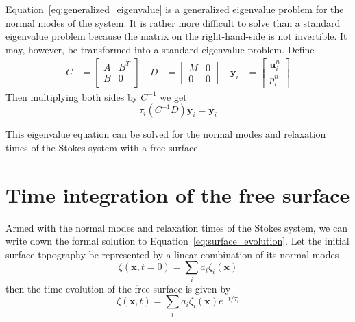 \documentclass[preprint,12pt,authoryear]{elsarticle}
\begin{document}
Equation~\eqref{eq:generalized_eigenvalue} is a generalized eigenvalue problem for the normal modes of the system.
It is rather more difficult to solve than a standard eigenvalue problem because the matrix on the right-hand-side 
is not invertible. It may, however, be transformed into a standard eigenvalue problem.
Define
\begin{equation}
\begin{aligned}
C &= 
\begin{bmatrix}
A & B^T \\
B & 0 \\
\end{bmatrix} \quad
D &= 
\begin{bmatrix}
M & 0 \\
0 & 0
\end{bmatrix} \quad
\mathbf{y}_i &= 
\begin{bmatrix}
\mathbf{u}^n_i \\
p^n_i
\end{bmatrix} 
\end{aligned}
\end{equation}
Then multiplying both sides by $C^{-1}$ we get
\begin{equation}
\tau_i (C^{-1}D)\mathbf{y}_i = \mathbf{y}_i
\label{eq:standard_eigenvalue}
\end{equation}

This eigenvalue equation can be solved for the normal modes and relaxation times of the Stokes system with 
a free surface.

\section{Time integration of the free surface}
\label{sec:timestepping}

Armed with the normal modes and relaxation times of the Stokes system, we can write down the
formal solution to Equation~\ref{eq:surface_evolution}. Let the initial surface topography be 
represented by a linear combination of its normal modes
\begin{equation}
\zeta(\mathbf{x}, t=0) = \displaystyle \sum_i a_i \zeta_i(\mathbf{x})
\end{equation}
then the time evolution of the free surface is given by
\begin{equation}
\zeta( \mathbf{x}, t) = \displaystyle \sum_i a_i \zeta_i(\mathbf{x}) e^{-t/\tau_i}
\end{equation}
\end{document}
